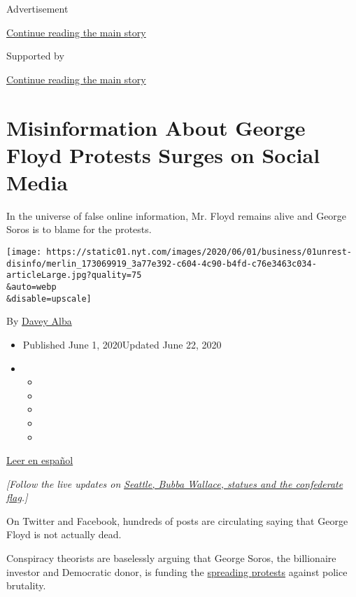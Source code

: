 Advertisement

\protect\hyperlink{after-top}{Continue reading the main story}

Supported by

\protect\hyperlink{after-sponsor}{Continue reading the main story}

\hypertarget{misinformation-about-george-floyd-protests-surges-on-social-media}{%
\section{Misinformation About George Floyd Protests Surges on Social
Media}\label{misinformation-about-george-floyd-protests-surges-on-social-media}}

In the universe of false online information, Mr. Floyd remains alive and
George Soros is to blame for the protests.

\texttt{[image: https://static01.nyt.com/images/2020/06/01/business/01unrest-disinfo/merlin\_173069919\_3a77e392-c604-4c90-b4fd-c76e3463c034-articleLarge.jpg?quality=75\\\&auto=webp\\\&disable=upscale]}

By \href{https://www.nytimes.com/by/davey-alba}{Davey Alba}

\begin{itemize}
\item
  Published June 1, 2020Updated June 22, 2020
\item
  \begin{itemize}
  \item
  \item
  \item
  \item
  \item
  \end{itemize}
\end{itemize}

\href{https://www.nytimes.com/es/2020/06/03/espanol/ciencia-y-tecnologia/george-floyd-desinformacion-fake-news.html}{Leer
en español}

\emph{{[}Follow the live updates on}
\href{https://www.nytimes.com/2020/06/22/us/seattle-shooting-roosevelt-statue-nascar-noose.html}{\emph{Seattle,
Bubba Wallace, statues and the confederate flag}}\emph{.{]}}

On Twitter and Facebook, hundreds of posts are circulating saying that
George Floyd is not actually dead.

Conspiracy theorists are baselessly arguing that George Soros, the
billionaire investor and Democratic donor, is funding the
\href{https://www.nytimes.com/live/2020/george-floyd-protests-today-06-01}{spreading
protests} against police brutality.

